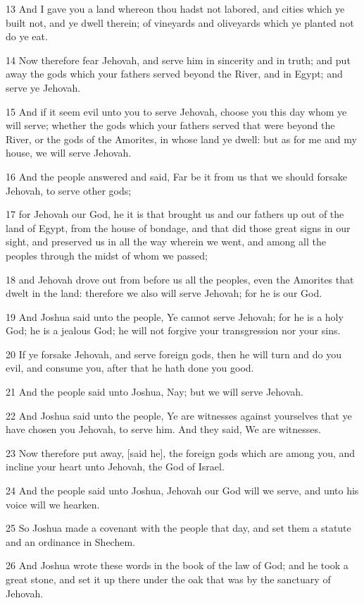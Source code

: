 \par 13 And I gave you a land whereon thou hadst not labored, and cities which ye built not, and ye dwell therein; of vineyards and oliveyards which ye planted not do ye eat.
\par 14 Now therefore fear Jehovah, and serve him in sincerity and in truth; and put away the gods which your fathers served beyond the River, and in Egypt; and serve ye Jehovah.
\par 15 And if it seem evil unto you to serve Jehovah, choose you this day whom ye will serve; whether the gods which your fathers served that were beyond the River, or the gods of the Amorites, in whose land ye dwell: but as for me and my house, we will serve Jehovah.
\par 16 And the people answered and said, Far be it from us that we should forsake Jehovah, to serve other gods;
\par 17 for Jehovah our God, he it is that brought us and our fathers up out of the land of Egypt, from the house of bondage, and that did those great signs in our sight, and preserved us in all the way wherein we went, and among all the peoples through the midst of whom we passed;
\par 18 and Jehovah drove out from before us all the peoples, even the Amorites that dwelt in the land: therefore we also will serve Jehovah; for he is our God.
\par 19 And Joshua said unto the people, Ye cannot serve Jehovah; for he is a holy God; he is a jealous God; he will not forgive your transgression nor your sins.
\par 20 If ye forsake Jehovah, and serve foreign gods, then he will turn and do you evil, and consume you, after that he hath done you good.
\par 21 And the people said unto Joshua, Nay; but we will serve Jehovah.
\par 22 And Joshua said unto the people, Ye are witnesses against yourselves that ye have chosen you Jehovah, to serve him. And they said, We are witnesses.
\par 23 Now therefore put away, [said he], the foreign gods which are among you, and incline your heart unto Jehovah, the God of Israel.
\par 24 And the people said unto Joshua, Jehovah our God will we serve, and unto his voice will we hearken.
\par 25 So Joshua made a covenant with the people that day, and set them a statute and an ordinance in Shechem.
\par 26 And Joshua wrote these words in the book of the law of God; and he took a great stone, and set it up there under the oak that was by the sanctuary of Jehovah.
